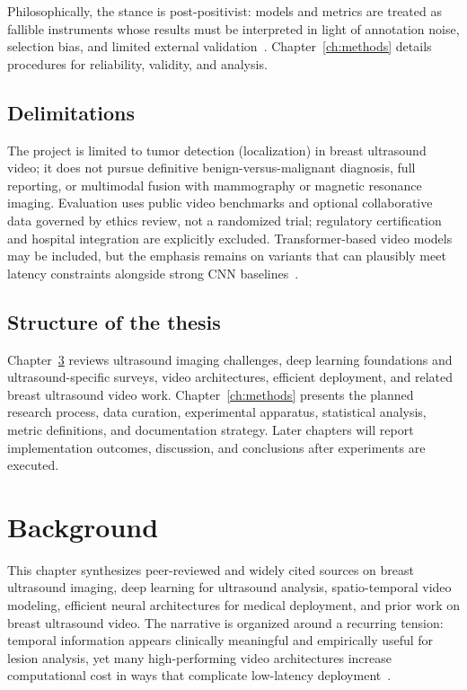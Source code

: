 \documentclass[
english,                 %
bibtex,                  %
]{kththesis}
\numberwithin{listing}{chapter}
\begin{document}
Philosophically, the stance is post-positivist: models and metrics are treated as fallible instruments whose results must be interpreted in light of annotation noise, selection bias, and limited external validation~\cite{dan2024_breast_us_dl_review}.
Chapter~\ref{ch:methods} details procedures for reliability, validity, and analysis.

\section{Delimitations}

The project is limited to tumor detection (localization) in breast ultrasound video; it does not pursue definitive benign-versus-malignant diagnosis, full reporting, or multimodal fusion with mammography or magnetic resonance imaging.
Evaluation uses public video benchmarks and optional collaborative data governed by ethics review, not a randomized trial; regulatory certification and hospital integration are explicitly excluded.
Transformer-based video models may be included, but the emphasis remains on variants that can plausibly meet latency constraints alongside strong CNN baselines~\cite{dosovitskiy2021_vit,liu2022_video_swin_transformer,liu2023_edgemednet}.

\section{Structure of the thesis}

Chapter~\ref{ch:background} reviews ultrasound imaging challenges, deep learning foundations and ultrasound-specific surveys, video architectures, efficient deployment, and related breast ultrasound video work.
Chapter~\ref{ch:methods} presents the planned research process, data curation, experimental apparatus, statistical analysis, metric definitions, and documentation strategy.
Later chapters will report implementation outcomes, discussion, and conclusions after experiments are executed.

\cleardoublepage
\chapter{Background}
\label{ch:background}

This chapter synthesizes peer-reviewed and widely cited sources on breast ultrasound imaging, deep learning for ultrasound analysis, spatio-temporal video modeling, efficient neural architectures for medical deployment, and prior work on breast ultrasound video.
The narrative is organized around a recurring tension: temporal information appears clinically meaningful and empirically useful for lesion analysis, yet many high-performing video architectures increase computational cost in ways that complicate low-latency deployment~\cite{lin2022_buv_miccai,huang2023_3dcnn_video_review,liu2023_edgemednet,wang2021_ultrasound_dl_review}.
\end{document}
